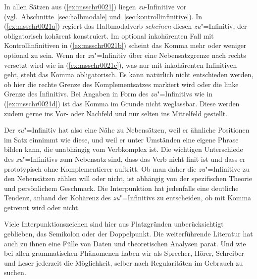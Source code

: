 In allen Sätzen aus (\ref{ex:msschr0021}) liegen \textit{zu}-Infinitive vor (vgl.\ Abschnitte~\ref{sec:halbmodale} und~\ref{sec:kontrollinfinitive}).
In (\ref{ex:msschr0021a}) regiert das Halbmodalverb \textit{scheinen} diesen \textit{zu}"=Infinitiv, der obligatorisch kohärent konstruiert.
Im optional inkohärenten Fall mit Kontrollinfinitiven in (\ref{ex:msschr0021b}) scheint das Komma mehr oder weniger optional zu sein.
Wenn der \textit{zu}"=Infinitiv über eine Nebensatzgrenze nach rechts versetzt wird wie in (\ref{ex:msschr0021c}), was nur mit inkohärenten Infinitiven geht, steht das Komma obligatorisch.
Es kann natürlich nicht entschieden werden, ob hier die rechte Grenze des Komplementsatzes markiert wird oder die linke Grenze des Infinitivs.
Bei Angaben in Form des \textit{zu}"=Infinitivs wie in (\ref{ex:msschr0021d}) ist das Komma im Grunde nicht weglassbar.
Diese werden zudem gerne ins Vor- oder Nachfeld und nur selten ins Mittelfeld gestellt.

Der \textit{zu}"=Infinitiv hat also eine Nähe zu Nebensätzen, weil er ähnliche Positionen im Satz einnimmt wie diese, und weil er unter Umständen eine eigene Phrase bilden kann, die unabhängig vom Verbkomplex ist.
Die wichtigen Unterschiede des \textit{zu}"=Infinitivs zum Nebensatz sind, dass das Verb nicht finit ist und dass er prototypisch ohne Komplementierer auftritt.
Ob man daher die \textit{zu}"=Infinitive zu den Nebensätzen zählen will oder nicht, ist abhängig von der spezifischen Theorie und persönlichem Geschmack.
Die Interpunktion hat jedenfalls eine deutliche Tendenz, anhand der Kohärenz des \textit{zu}"=Infinitivs zu entscheiden, ob mit Komma getrennt wird oder nicht.

Viele Interpunktionszeichen sind hier aus Platzgründen unberücksichtigt geblieben, \zB das Semikolon oder der Doppelpunkt.
Die weiterführende Literatur hat auch zu ihnen eine Fülle von Daten und theoretischen Analysen parat.
Und wie bei allen grammatischen Phänomenen haben wir als Sprecher, Hörer, Schreiber und Leser jederzeit die Möglichkeit, selber nach Regularitäten im Gebrauch zu suchen.




